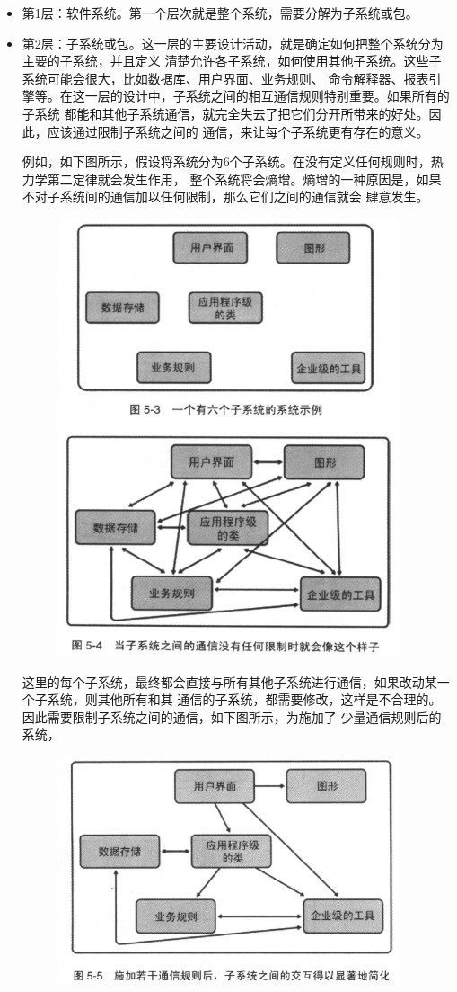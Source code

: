\documentclass{article}
\begin{document}
\begin{itemize}
    \item 第1层：软件系统。第一个层次就是整个系统，需要分解为子系统或包。
    \item 第2层：子系统或包。这一层的主要设计活动，就是确定如何把整个系统分为主要的子系统，并且定义
    清楚允许各子系统，如何使用其他子系统。这些子系统可能会很大，比如数据库、用户界面、业务规则、
    命令解释器、报表引擎等。在这一层的设计中，子系统之间的相互通信规则特别重要。如果所有的子系统
    都能和其他子系统通信，就完全失去了把它们分开所带来的好处。因此，应该通过限制子系统之间的
    通信，来让每个子系统更有存在的意义。
    \par
    例如，如下图所示，假设将系统分为6个子系统。在没有定义任何规则时，热力学第二定律就会发生作用，
    整个系统将会熵增。熵增的一种原因是，如果不对子系统间的通信加以任何限制，那么它们之间的通信就会
    肆意发生。
    \begin{figure}[ht]
        \centering
        \includegraphics[width=10cm]{figure3.png}
    \end{figure}
    这里的每个子系统，最终都会直接与所有其他子系统进行通信，如果改动某一个子系统，则其他所有和其
    通信的子系统，都需要修改，这样是不合理的。因此需要限制子系统之间的通信，如下图所示，为施加了
    少量通信规则后的系统，
    \begin{figure}[ht]
        \centering
        \includegraphics[width=10cm]{figure4.png}

\end{figure}
\end{itemize}
\end{document}
